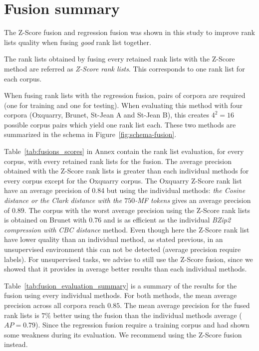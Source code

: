 \section{Fusion summary}

The Z-Score fusion and regression fusion was shown in this study to improve rank lists quality when fusing \textit{good} rank list together.

The rank lists obtained by fusing every retained rank lists with the Z-Score method are referred as \textit{Z-Score rank lists}.
This corresponds to one rank list for each corpus.

When fusing rank lists with the regression fusion, pairs of corpora are required (one for training and one for testing).
When evaluating this method with four corpora (Oxquarry, Brunet, St-Jean A and St-Jean B), this creates $4^2 = 16$ possible corpus pairs which yield one rank list each.
These two methods are summarized in the schema in Figure~\ref{fig:schema-fusion}.

Table~\ref{tab:fusions_scores} in Annex contain the rank list evaluation, for every corpus, with every retained rank lists for the fusion.
The average precision obtained with the Z-Score rank lists is greater than each individual methods for every corpus except for the Oxquarry corpus.
The Oxquarry Z-Score rank list have an average precision of 0.84 but using the individual methods: \textit{the Cosine distance or the Clark distance with the $750$-MF tokens} gives an average precision of $0.89$.
The corpus with the worst average precision using the Z-Score rank lists is obtained on Brunet with $0.76$ and is as efficient as the individual \textit{BZip2 compression with CBC distance} method.
Even though here the Z-Score rank list have lower quality than an individual method, as stated previous, in an unsupervised environment this can not be detected (average precision require labels).
For unsupervised tasks, we advise to still use the Z-Score fusion, since we showed that it provides in average better results than each individual methods.

Table~\ref{tab:fusion_evaluation_summary} is a summary of the results for the fusion using every individual methods.
For both methods, the mean average precision across all corpora reach $0.85$.
The mean average precision for the fused rank lists is $7\%$ better using the fusion than the individual methods average ($AP = 0.79$).
Since the regression fusion require a training corpus and had shown some weakness during its evaluation.
We recommend using the Z-Score fusion instead.

